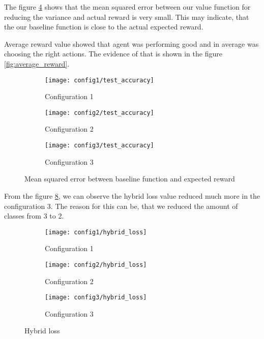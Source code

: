 The figure \ref{fig:baseline_mse} shows that the mean squared error between our value function
for reducing the variance and actual reward is very small. This may indicate, that
the our baseline function is close to the actual expected reward.

Average reward value showed that agent was performing good and
in average was choosing the right actions. The evidence of that is
shown in the figure \ref{fig:average_reward}.
\begin{figure}
\centering
\begin{subfigure}{\textwidth}
  \centering
  \texttt{[image: config1/test\_accuracy]}
  \caption{Configuration 1}
  \label{fig:sub1}
\end{subfigure}
\begin{subfigure}{\textwidth}
  \centering
  \texttt{[image: config2/test\_accuracy]}
  \caption{Configuration 2}
  \label{fig:sub2}
\end{subfigure}
\begin{subfigure}{\textwidth}
  \centering
  \texttt{[image: config3/test\_accuracy]}
  \caption{Configuration 3}
  \label{fig:sub2}
\end{subfigure}
\caption{Mean squared error between baseline function and expected reward}
\label{fig:baseline_mse}
\end{figure}

From the figure \ref{fig:hybrid_loss}, we can observe the hybrid loss value reduced much more in
the  configuration 3. The reason for this can be, that we reduced the amount
of classes from 3 to 2.
\begin{figure}
\centering
\begin{subfigure}{\textwidth}
  \centering
  \texttt{[image: config1/hybrid\_loss]}
  \caption{Configuration 1}
  \label{fig:sub1}
\end{subfigure}
\begin{subfigure}{\textwidth}
  \centering
  \texttt{[image: config2/hybrid\_loss]}
  \caption{Configuration 2}
  \label{fig:sub2}
\end{subfigure}
\begin{subfigure}{\textwidth}
  \centering
  \texttt{[image: config3/hybrid\_loss]}
  \caption{Configuration 3}
  \label{fig:sub2}
\end{subfigure}
\caption{Hybrid loss}
\label{fig:hybrid_loss}
\end{figure}



